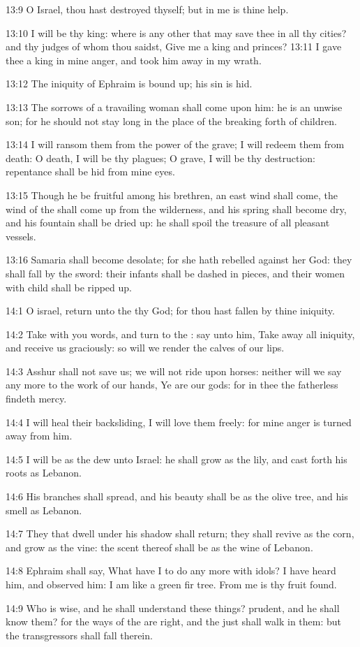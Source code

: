 13:9 O Israel, thou hast destroyed thyself; but in me is thine help.

13:10 I will be thy king: where is any other that may save thee in all thy cities? and thy judges of whom thou saidst, Give me a king and princes?  13:11 I gave thee a king in mine anger, and took him away in my wrath.

13:12 The iniquity of Ephraim is bound up; his sin is hid.

13:13 The sorrows of a travailing woman shall come upon him: he is an unwise son; for he should not stay long in the place of the breaking forth of children.

13:14 I will ransom them from the power of the grave; I will redeem them from death: O death, I will be thy plagues; O grave, I will be thy destruction: repentance shall be hid from mine eyes.

13:15 Though he be fruitful among his brethren, an east wind shall come, the wind of the \LORD shall come up from the wilderness, and his spring shall become dry, and his fountain shall be dried up: he shall spoil the treasure of all pleasant vessels.

13:16 Samaria shall become desolate; for she hath rebelled against her God: they shall fall by the sword: their infants shall be dashed in pieces, and their women with child shall be ripped up.

14:1 O israel, return unto the \LORD thy God; for thou hast fallen by thine iniquity.

14:2 Take with you words, and turn to the \LORD: say unto him, Take away all iniquity, and receive us graciously: so will we render the calves of our lips.

14:3 Asshur shall not save us; we will not ride upon horses: neither will we say any more to the work of our hands, Ye are our gods: for in thee the fatherless findeth mercy.

14:4 I will heal their backsliding, I will love them freely: for mine anger is turned away from him.

14:5 I will be as the dew unto Israel: he shall grow as the lily, and cast forth his roots as Lebanon.

14:6 His branches shall spread, and his beauty shall be as the olive tree, and his smell as Lebanon.

14:7 They that dwell under his shadow shall return; they shall revive as the corn, and grow as the vine: the scent thereof shall be as the wine of Lebanon.

14:8 Ephraim shall say, What have I to do any more with idols? I have heard him, and observed him: I am like a green fir tree. From me is thy fruit found.

14:9 Who is wise, and he shall understand these things? prudent, and he shall know them? for the ways of the \LORD are right, and the just shall walk in them: but the transgressors shall fall therein.

